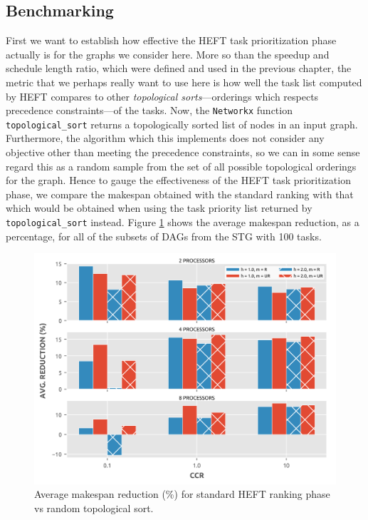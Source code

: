 \documentclass[12pt]{article}
\begin{document}
\subsection{Benchmarking}
\label{subsect.benchmarking}

First we want to establish how effective the HEFT task prioritization phase actually is for the graphs we consider here. More so than the speedup and schedule length ratio, which were defined and used in the previous chapter, the metric that we perhaps really want to use here is how well the task list computed by HEFT compares to other {\em topological sorts}---orderings which respects precedence constraints---of the tasks. Now, the {\tt Networkx} function {\tt topological\_sort} returns a topologically sorted list of nodes in an input graph. Furthermore, the algorithm which this implements does not consider any objective other than meeting the precedence constraints, so we can in some sense regard this as a random sample from the set of all possible topological orderings for the graph. Hence to gauge the effectiveness of the HEFT task prioritization phase, we compare the makespan obtained with the standard ranking with that which would be obtained when using the task priority list returned by {\tt topological\_sort} instead. Figure \ref{plot.benchmark_reductions_100} shows the average makespan reduction, as a percentage, for all of the subsets of DAGs from the STG with 100 tasks.

\begin{figure}
	\centering	
	\includegraphics[scale=0.8]{100tasks_reductions.png}
	\caption{Average makespan reduction (\%) for standard HEFT ranking phase vs random topological sort.}	
	\label{plot.benchmark_reductions_100}
\end{figure} 
\end{document}
